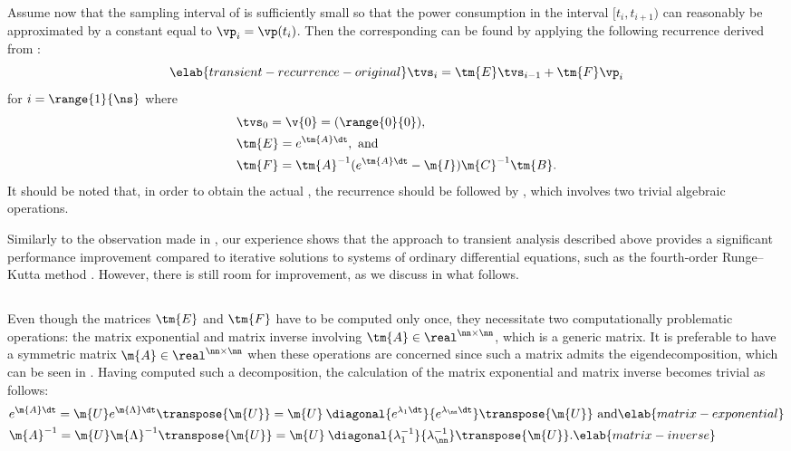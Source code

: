 Assume now that the sampling interval \dt of \mp is sufficiently small so that
the power consumption in the interval $[t_i, t_{i + 1})$ can reasonably be
approximated by a constant equal to $\vp_i = \vp(t_i)$. Then the corresponding
\mq can be found by applying the following recurrence derived from
:
\begin{equation} \elab{transient-recurrence-original}
  \tvs_{i} = \tm{E} \tvs_{i - 1} + \tm{F} \vp_i
\end{equation}
for $i = \range{1}{\ns}$ where
\begin{align*}
  & \tvs_0 = \v{0} = (\range{0}{0}), \\
  & \tm{E} = e^{\tm{A} \dt}, \text{ and} \\
  & \tm{F} = \tm{A}^{-1}(e^{\tm{A} \dt} - \m{I})\m{C}^{-1} \tm{B}.
\end{align*}
It should be noted that, in order to obtain the actual \mq, the recurrence
should be followed by , which involves two
trivial algebraic operations.

Similarly to the observation made in \cite{thiele2011}, our experience shows
that the approach to transient analysis described above provides a significant
performance improvement compared to iterative solutions to systems of ordinary
differential equations, such as the fourth-order Runge--Kutta method
\cite{press2007}. However, there is still room for improvement, as we discuss in
what follows.

\subsection{\solutiontitle}

Even though the matrices $\tm{E}$ and $\tm{F}$ have to be computed only once,
they necessitate two computationally problematic operations: the matrix
exponential and matrix inverse involving $\tm{A} \in \real^{\nn \times \nn}$,
which is a generic matrix. It is preferable to have a symmetric matrix $\m{A}
\in \real^{\nn \times \nn}$ when these operations are concerned since such a
matrix admits the eigendecomposition, which can be seen in
. Having computed such a decomposition, the calculation
of the matrix exponential and matrix inverse becomes trivial as follows:
\begin{align}
  & e^{\m{A} \dt}
  = \m{U} e^{\m{\Lambda} \dt} \transpose{\m{U}}
  = \m{U} \: \diagonal{e^{\lambda_1 \dt}}{e^{\lambda_\nn \dt}} \transpose{\m{U}} \text{ and} \elab{matrix-exponential} \\
  & \m{A}^{-1}
  = \m{U} \m{\Lambda}^{-1} \transpose{\m{U}}
  = \m{U} \: \diagonal{\lambda_1^{-1}}{\lambda_\nn^{-1}} \transpose{\m{U}}. \elab{matrix-inverse}
\end{align}


